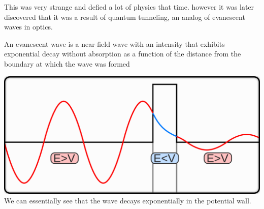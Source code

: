 \documentclass[english, 11pt]{article}
\begin{document}
        This was very strange and defied a lot of physics that time. however it was later discovered that it was a result of quantum tunneling, an analog of evanescent waves in optics. 

        \begin{defn}
          An evanescent wave is a near-field wave with an intensity that exhibits exponential decay without absorption as a function of the distance from the boundary at which the wave was formed
        \end{defn}

         

      \begin{center}
         \includegraphics[scale=0.7]{../img/qwave}\\
         We can essentially see that the wave decays exponentially in the potential wall.
      \end{center}




  
\end{document}
